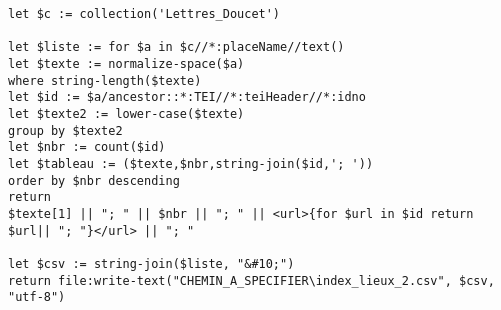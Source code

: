 \begin{verbatim}
let $c := collection('Lettres_Doucet')

let $liste := for $a in $c//*:placeName//text()
let $texte := normalize-space($a)
where string-length($texte)
let $id := $a/ancestor::*:TEI//*:teiHeader//*:idno
let $texte2 := lower-case($texte)
group by $texte2
let $nbr := count($id)
let $tableau := ($texte,$nbr,string-join($id,'; '))
order by $nbr descending
return
$texte[1] || "; " || $nbr || "; " || <url>{for $url in $id return $url|| "; "}</url> || "; "

let $csv := string-join($liste, "&#10;")
return file:write-text("CHEMIN_A_SPECIFIER\index_lieux_2.csv", $csv, "utf-8")
\end{verbatim}